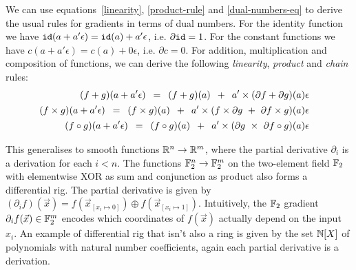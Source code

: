 We can use equations~\ref{linearity}, \ref{product-rule} and \ref{dual-numbers-eq} to derive the usual rules for gradients in terms of dual numbers.
For the identity function we have $\mathtt{id}(a + a' \epsilon) = \mathtt{id}(a) + a' \epsilon$, i.e. $\partial \mathtt{id} = 1$.
For the constant functions we have $c(a + a' \epsilon) = c(a) + 0 \epsilon$, i.e. $\partial c = 0$.
For addition, multiplication and composition of functions, we can derive the following \emph{linearity}, \emph{product} and \emph{chain} rules:
\begin{align} \begin{split}
    (f + g)(a + a' \epsilon)
    \s &= \s (f + g)(a) \s + \s a' \times (\partial f + \partial g)(a) \epsilon
\end{split}\\ \begin{split}
    (f \times g)(a + a' \epsilon)
    \s &= \s (f \times g)(a) \s + \s a' \times (f \times \partial g \ + \ \partial f \times g)(a) \epsilon
\end{split}\\ \begin{split}
    (f \circ g)(a + a' \epsilon)
    \s &= \s (f \circ g)(a) \s + \s a' \times (\partial g \ \times \ \partial f \circ g)(a) \epsilon
\end{split} \end{align}

This generalises to smooth functions $\mathbb{R}^n \to \mathbb{R}^m$, where the partial derivative $\partial_i$ is a derivation for each $i < n$.
The functions $\mathbb{F}_2^n \to \mathbb{F}_2^m$ on the two-element field $\mathbb{F}_2$ with elementwise XOR as sum and conjunction as product also forms a differential rig.
The partial derivative is given by $(\partial_i f)(\vec{x}) = f(\vec{x}_{[x_i \mapsto 0]}) \oplus f(\vec{x}_{[x_i \mapsto 1]})$.
Intuitively, the $\mathbb{F}_2$ gradient $\partial_i f(\vec{x}) \in \mathbb{F}_2^m$ encodes which coordinates of $f(\vec{x})$ actually depend on the input $x_i$.
An example of differential rig that isn't also a ring is given by the set $\mathbb{N}[X]$ of polynomials with natural number coefficients, again each partial derivative is a derivation.


